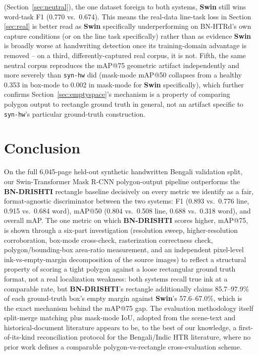 \documentclass[11pt]{article}
\newcommand{\swin}{\textbf{Swin}}
\newcommand{\bnd}{\textbf{BN-DRISHTI}}
\begin{document}
(Section~\ref{sec:neutral}), the one dataset foreign to both systems, \swin{} still wins
word-task F1 (0.770 vs.\ 0.674). This means the real-data line-task loss in Section
\ref{sec:real} is better read as \swin{} specifically underperforming on BN-HTRd's own
capture conditions (or on the line task specifically) rather than as evidence \swin{}
is broadly worse at handwriting detection once its training-domain advantage is
removed -- on a third, differently-captured real corpus, it is not. Fifth, the
same neutral corpus reproduces the mAP@75 geometric artifact independently and more
severely than \texttt{syn-hw} did (mask-mode mAP@50 collapses from a healthy 0.353 in
box-mode to 0.002 in mask-mode for \swin{} specifically), which further confirms
Section~\ref{sec:emptyspace}'s mechanism is a property of comparing polygon output to
rectangle ground truth in general, not an artifact specific to \texttt{syn-hw}'s
particular ground-truth construction.

\section{Conclusion}
\label{sec:conclusion}

On the full 6{,}045-page held-out synthetic handwritten Bengali validation split, our
Swin-Transformer Mask R-CNN polygon-output pipeline outperforms the \bnd{} rectangle
baseline decisively on every metric we identify as a fair, format-agnostic
discriminator between the two systems: F1 (0.893 vs.\ 0.776 line, 0.915 vs.\ 0.684
word), mAP@50 (0.804 vs.\ 0.508 line, 0.688 vs.\ 0.318 word), and overall mAP. The one
metric on which \bnd{} scores higher, mAP@75, is shown through a six-part investigation
(resolution sweep, higher-resolution corroboration, box-mode cross-check, rasterization
correctness check, polygon/bounding-box area-ratio measurement, and an independent
pixel-level ink-vs-empty-margin decomposition of the source images) to reflect a
structural property of scoring a tight polygon against a loose rectangular ground truth
format, not a real localization weakness: both systems recall true ink at a comparable
rate, but \bnd's rectangle additionally claims 85.7--97.9\% of each ground-truth box's
empty margin against \swin's 57.6--67.0\%, which is the exact mechanism behind the
mAP@75 gap. The evaluation methodology itself
\textemdash{} split-merge matching plus mask-mode IoU, adopted from the scene-text and
historical-document literature \textemdash{} appears to be, to the best of our
knowledge, a first-of-its-kind reconciliation protocol for the Bengali/Indic HTR
literature, where no prior work defines a comparable polygon-vs-rectangle
cross-evaluation scheme.
\end{document}
